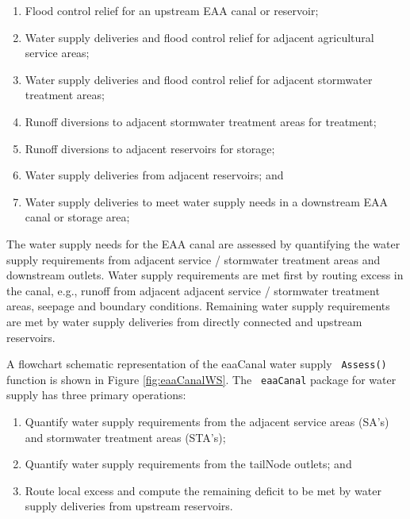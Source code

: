 \begin{enumerate}

 \item Flood control relief for an upstream EAA canal or reservoir;

 \item Water supply deliveries and flood control relief for adjacent
   agricultural service areas;

 \item Water supply deliveries and flood control relief for adjacent
   stormwater treatment areas;

 \item Runoff diversions to adjacent stormwater treatment areas for
   treatment;

 \item Runoff diversions to adjacent reservoirs for storage;

 \item Water supply deliveries from adjacent reservoirs; and

 \item Water supply deliveries to meet water supply needs in a
 downstream EAA canal or storage area;

\end{enumerate}

The water supply needs for the EAA canal are assessed by quantifying
the water supply requirements from adjacent service / stormwater
treatment areas and downstream outlets.  Water supply requirements are
met first by routing excess in the canal, e.g., runoff from adjacent
adjacent service / stormwater treatment areas, seepage and boundary
conditions.  Remaining water supply requirements are met by water
supply deliveries from directly connected and upstream reservoirs.

A flowchart schematic representation of the eaaCanal water supply {\tt
Assess()} function is shown in Figure \ref{fig:eaaCanalWS}.  The {\tt
eaaCanal} package for water supply has three primary operations:

 \begin{enumerate}

  \item Quantify water supply requirements from the adjacent service
  areas (SA's) and stormwater treatment areas (STA's);

  \item Quantify water supply requirements from the tailNode outlets;
  and

  \item Route local excess and compute the remaining deficit to be met
  by water supply deliveries from upstream reservoirs.

\end{enumerate}


